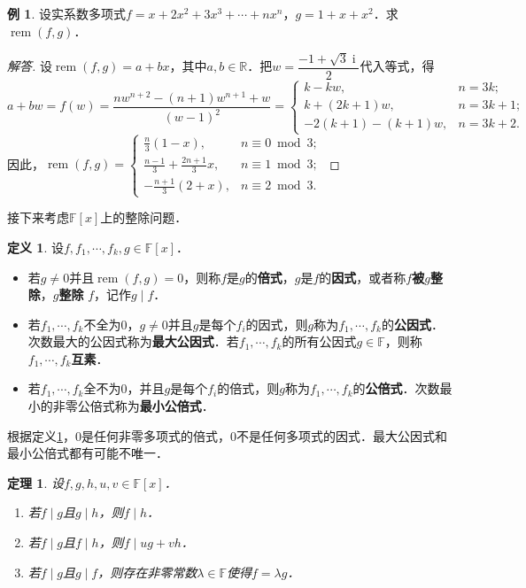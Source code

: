\documentclass[a4paper,fontset=windows]{ctexbook}
\newtheorem{theorem}{定理}[chapter]
\theoremstyle{definition}
\newtheorem{definition}{定义}[chapter]
\newtheorem{example}{例}[chapter]
\DeclareMathOperator{\I}{i}
\DeclareMathOperator{\rem}{rem}
\begin{document}
\begin{example}
设实系数多项式$f=x+2x^2+3x^3+\cdots+nx^n$，$g=1+x+x^2$．求$\rem(f,g)$．
\end{example}

\begin{proof}[解答]
设$\rem(f,g)=a+bx$，其中$a,b\in\mathbb{R}$．把$w=\dfrac{-1+\sqrt{3}\I}{2}$代入等式，得
$$a+bw=f(w)=\frac{nw^{n+2}-(n+1)w^{n+1}+w}{(w-1)^2}=\begin{cases}k-kw,&n=3k; \\ k+(2k+1)w,&n=3k+1; \\ -2(k+1)-(k+1)w,&n=3k+2.\end{cases}$$
因此，$\rem(f,g)=\begin{cases}\frac{n}{3}(1-x),&n\equiv 0\bmod 3; \\ \frac{n-1}{3}+\frac{2n+1}{3}x,&n\equiv 1\bmod 3; \\ -\frac{n+1}{3}(2+x),&n\equiv 2\bmod 3.\end{cases}$
\end{proof}

接下来考虑$\mathbb{F}[x]$上的整除问题．

\begin{definition}\label{def11.4}
设$f,f_1,\cdots,f_k,g\in\mathbb{F}[x]$．
\begin{itemize}
\item 若$g\ne 0$并且$\rem(f,g)=0$，则称$f$是$g$的{\bf 倍式}，$g$是$f$的{\bf 因式}，或者称$f${\bf 被$g$整除}，$g${\bf 整除} $f$，记作$g\mid f$．

\item 若$f_1,\cdots,f_k$不全为0，$g\ne 0$并且$g$是每个$f_i$的因式，则$g$称为$f_1,\cdots,f_k$的{\bf 公因式}．次数最大的公因式称为{\bf 最大公因式}．若$f_1,\cdots,f_k$的所有公因式$g\in\mathbb{F}$，则称$f_1,\cdots,f_k${\bf 互素}．

\item 若$f_1,\cdots,f_k$全不为0，并且$g$是每个$f_i$的倍式，则$g$称为$f_1,\cdots,f_k$的{\bf 公倍式}．次数最小的非零公倍式称为{\bf 最小公倍式}．
\end{itemize}
\end{definition}

根据定义\ref{def11.4}，0是任何非零多项式的倍式，0不是任何多项式的因式．最大公因式和最小公倍式都有可能不唯一．

\begin{theorem}\label{thm11.3}
设$f,g,h,u,v\in\mathbb{F}[x]$．
\begin{enumerate}
\item 若$f\mid g$且$g\mid h$，则$f\mid h$．

\item 若$f\mid g$且$f\mid h$，则$f\mid ug+vh$．

\item 若$f\mid g$且$g\mid f$，则存在非零常数$\lambda\in\mathbb{F}$使得$f=\lambda g$．
\end{enumerate}
\end{theorem}
\end{document}
